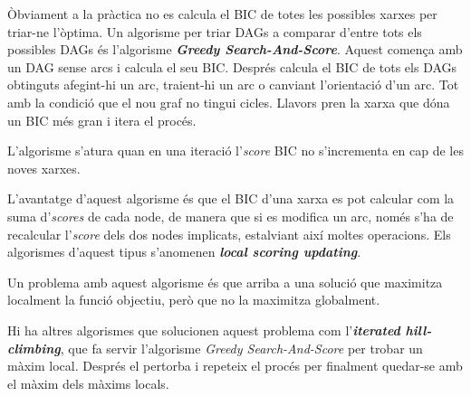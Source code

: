 \documentclass{article}
\theoremstyle{definition}
\begin{document}
\`{O}bviament a la pr\`{a}ctica no es calcula el BIC de totes les possibles xarxes per triar-ne l'\`{o}ptima. Un algorisme per triar DAGs a comparar d'entre tots els possibles DAGs \'{e}s l'algorisme \textbf{\emph{Greedy Search-And-Score}}. Aquest comen\c{c}a amb un DAG sense arcs i calcula el seu BIC. Despr\'{e}s calcula el BIC de tots els DAGs obtinguts afegint-hi un arc, traient-hi un arc o canviant l'orientaci\'{o} d'un arc. Tot amb la condici\'{o} que el nou graf no tingui cicles. Llavors pren la xarxa que d\'{o}na un BIC m\'{e}s gran i itera el proc\'{e}s.

L'algorisme s'atura quan en una iteraci\'{o} l'\emph{score} BIC no s'incrementa en cap de les noves xarxes.

L'avantatge d'aquest algorisme \'{e}s que el BIC d'una xarxa es pot calcular com la suma d'\emph{scores} de cada node, de manera que si es modifica un arc, nom\'{e}s s'ha de recalcular l'\emph{score} dels dos nodes implicats, estalviant aix\'{i} moltes operacions. Els algorismes d'aquest tipus s'anomenen \textbf{\emph{local scoring updating}}.

Un problema amb aquest algorisme \'{e}s que arriba a una soluci\'{o} que maximitza localment la funci\'{o} objectiu, per\`{o} que no la maximitza globalment.

Hi ha altres algorismes que solucionen aquest problema com l'\textbf{\emph{iterated hill-climbing}}, que fa servir l'algorisme \emph{Greedy Search-And-Score} per trobar un m\`{a}xim local. Despr\'{e}s el pertorba i repeteix el proc\'{e}s per finalment quedar-se amb el m\`{a}xim dels m\`{a}xims locals.
\end{document}
